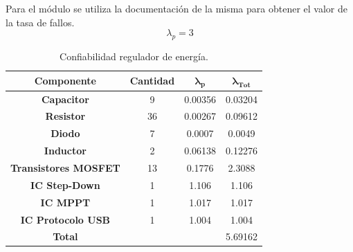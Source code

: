 \Subsubsection{\rspi}
Para el módulo \rspi se utiliza la documentación de la misma para obtener el valor de la tasa de fallos.
\begin{equation}
\lambda_p = 3 
\end{equation}
\begin{table}[H]
\centering
\begin{tabular}{|c|ccc|}
\hline
\textbf{Componente}          & \multicolumn{1}{c|}{\textbf{Cantidad}} & \multicolumn{1}{c|}{$\boldsymbol{\lambda_p}$}        & $\boldsymbol{\lambda_{Tot}}$ \\ \hline
\textbf{Capacitor}           & \multicolumn{1}{c|}{9}                 & \multicolumn{1}{c|}{\cellcolor[HTML]{FFFFFF}0.00356} & 0.03204                      \\ \hline
\textbf{Resistor}            & \multicolumn{1}{c|}{36}                & \multicolumn{1}{c|}{\cellcolor[HTML]{FFFFFF}0.00267} & 0.09612                      \\ \hline
\textbf{Diodo}               & \multicolumn{1}{c|}{7}                 & \multicolumn{1}{c|}{\cellcolor[HTML]{FFFFFF}0.0007}  & 0.0049                       \\ \hline
\textbf{Inductor}            & \multicolumn{1}{c|}{2}                 & \multicolumn{1}{c|}{0.06138}                         & 0.12276                      \\ \hline
\textbf{Transistores MOSFET} & \multicolumn{1}{c|}{13}                & \multicolumn{1}{c|}{0.1776}                          & 2.3088                       \\ \hline
\textbf{IC Step-Down}        & \multicolumn{1}{c|}{1}                 & \multicolumn{1}{c|}{1.106}                           & 1.106                        \\ \hline
\textbf{IC MPPT}             & \multicolumn{1}{c|}{1}                 & \multicolumn{1}{c|}{1.017}                           & 1.017                        \\ \hline
\textbf{IC Protocolo USB}    & \multicolumn{1}{c|}{1}                 & \multicolumn{1}{c|}{1.004}                           & 1.004                        \\ \hline
\textbf{Total}               & \multicolumn{1}{l}{}                   & \multicolumn{1}{l}{}                                 & \multicolumn{1}{r|}{5.69162} \\ \hline
\end{tabular}
\caption{Confiabilidad regulador de energía.}
\label{confReg}
\end{table}


